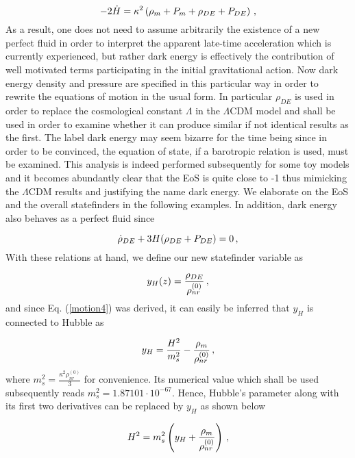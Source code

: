 \documentclass[aps,prd,twocolumn,groupedaddress,showpacs,nofootinbib,amssymb]{revtex4-2}
\begin{document}
\begin{equation}
\centering
\label{motion5}
-2\dot H=\kappa^2\left(\rho_m+P_m+\rho_{DE}+P_{DE}\right)\, ,
\end{equation}
As a result, one does not need to assume arbitrarily the existence of a new perfect fluid in order to interpret the apparent late-time acceleration
which is currently experienced, but rather dark energy is effectively the contribution of well motivated terms participating in the initial gravitational action. Now dark energy density and pressure are specified in this particular way in order to rewrite the equations of motion in the usual form. In particular $\rho_{DE}$ is used in order to replace the cosmological constant $\Lambda$ in the $\Lambda$CDM model and shall be used in order to examine whether it can produce similar if not identical results as the first. The label dark energy may seem bizarre for the time being since in order to be convinced, the equation of state, if a barotropic relation is used, must be examined. This analysis is indeed performed subsequently for some toy models and it becomes abundantly clear that the EoS is quite close to -1 thus mimicking the $\Lambda$CDM results and justifying the name dark energy. We elaborate on the EoS and the overall statefinders in the following examples. In addition, dark energy also behaves as a perfect fluid since

\begin{equation}
\centering
\label{continuityDE}
\dot\rho_{DE}+3H(\rho_{DE}+P_{DE})=0\, ,
\end{equation}
With these relations at hand, we define our new statefinder variable as

\begin{equation}
\centering
\label{yH}
y_H(z)=\frac{\rho_{DE}}{\rho_{nr}^{(0)}}\, ,
\end{equation}
and since Eq. (\ref{motion4}) was derived, it can easily be inferred that $y_H$ is connected to Hubble as

\begin{equation}
\centering
\label{yH1}
y_H=\frac{H^2}{m_s^2}-\frac{\rho_m}{\rho_{nr}^{(0)}}\, ,
\end{equation}
where $m_s^2=\frac{\kappa^2\rho_{nr}^{(0)}}{3}$ for convenience. Its numerical value which shall be used subsequently reads $m_s^2=1.87101\cdot10^{-67}$. Hence, Hubble's parameter along with its first two derivatives can be replaced by $y_H$ as shown below

\begin{equation}
\centering
\label{H1}
H^2=m_s^2\left(y_H+\frac{\rho_m}{\rho_{nr}^{(0)}}\right)\, ,
\end{equation}
\end{document}
